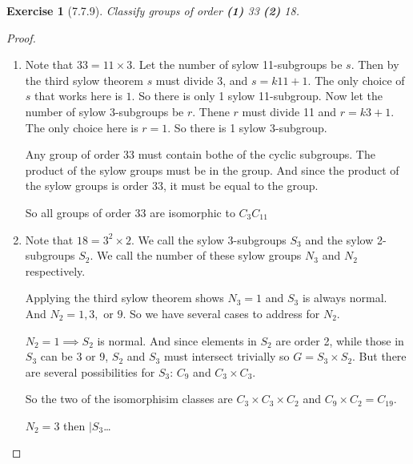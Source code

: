 \documentclass[12pt]{article}
\newtheorem*{exer}{Exercise}
\begin{document}

\begin{exer}[7.7.9]

    Classify groups of order \textbf{(1)} 33 \textbf{(2)} 18.

\end{exer}

\begin{proof}

    \begin{enumerate}
        \item Note that $33 = 11 \times 3$. Let the number of sylow
            11-subgroups be $s$. Then by the third sylow theorem $s$
            must divide 3, and $s = k11 + 1$. The only choice of $s$
            that works here is $1$. So there is only 1 sylow
            11-subgroup. Now let the number of sylow 3-subgroups be $r$.
            Thene $r$ must divide 11 and $r = k3 + 1$. The only choice
            here is $r = 1$. So there is 1 sylow 3-subgroup.

            Any group of order 33 must contain bothe of the cyclic
            subgroups. The product of the sylow groups must be in the
            group. And since the product of the sylow groups is order
            33, it must be equal to the group. 

            So all groups of order 33 are isomorphic to $C_{3} C_{11}$

        \item Note that $18 = 3^2 \times 2$. We call the sylow
            3-subgroups $S_3$ and the sylow 2-subgroups $S_2$. We call
            the number of these sylow groups $N_3$ and $N_2$
            respectively.

            Applying the third sylow theorem shows $N_3 = 1$ and $S_3$
            is always normal. And $N_2 = 1, 3,$ or $9$. So we have
            several cases to address for $N_2$.

            $N_2 = 1 \implies S_2$ is normal. And since elements in
            $S_2$ are order 2, while those in $S_3$ can be 3 or 9, $S_2$
            and $S_3$ must intersect trivially so $G = S_3 \times S_2$.
            But there are several possibilities for $S_3$: $C_9$ and $C_3
            \times C_3$. 

            So the two of the isomorphisim classes are $C_3 \times C_3
            \times C_2$ and $C_9 \times C_2 = C_{19}$.

            $N_2 = 3$ then $|S_3$\dots


    \end{enumerate}

\end{proof}
\end{document}
